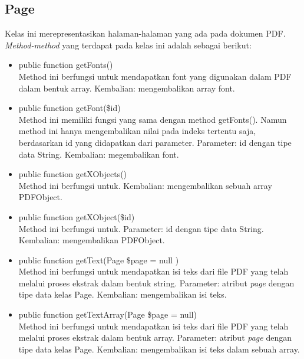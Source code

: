 \subsection{Page}
Kelas ini merepresentasikan halaman-halaman yang ada pada dokumen PDF. \textit{Method-method} yang terdapat pada kelas ini adalah sebagai berikut:

\begin{itemize}
	\item public function getFonts() \\
	Method ini berfungsi untuk mendapatkan font yang digunakan dalam PDF dalam bentuk array. \newline
	Kembalian: mengembalikan array font.	
	
	\item public function getFont(\$id) \\
	Method ini memiliki fungsi yang sama dengan method getFonts(). Namun method ini hanya mengembalikan nilai pada indeks tertentu saja, berdasarkan id yang didapatkan dari parameter. \newline
	Parameter: id dengan tipe data String. \newline
	Kembalian: megembalikan font.
	
	\item public function getXObjects() \\
	Method ini berfungsi untuk. \newline
	Kembalian: mengembalikan sebuah array PDFObject.
	
	\item public function getXObject(\$id) \\
	Method ini berfungsi untuk. \newline
	Parameter: id dengan tipe data String. \newline
	Kembalian: mengembalikan PDFObject.
	
	\item public function getText(Page \$page = null )\\
	Method ini berfungsi untuk mendapatkan isi teks dari file PDF yang telah melalui proses ekstrak dalam bentuk string. \newline
	Parameter: atribut \textit{page} dengan tipe data kelas Page. \newline
	Kembalian: mengembalikan isi teks.
		
	\item public function getTextArray(Page \$page = null) \\
	Method ini berfungsi untuk mendapatkan isi teks dari file PDF yang telah melalui proses ekstrak dalam bentuk array. \newline
	Parameter: atribut \textit{page} dengan tipe data kelas Page. \newline
	Kembalian: mengembalikan isi teks dalam sebuah array.
	
\end{itemize}

